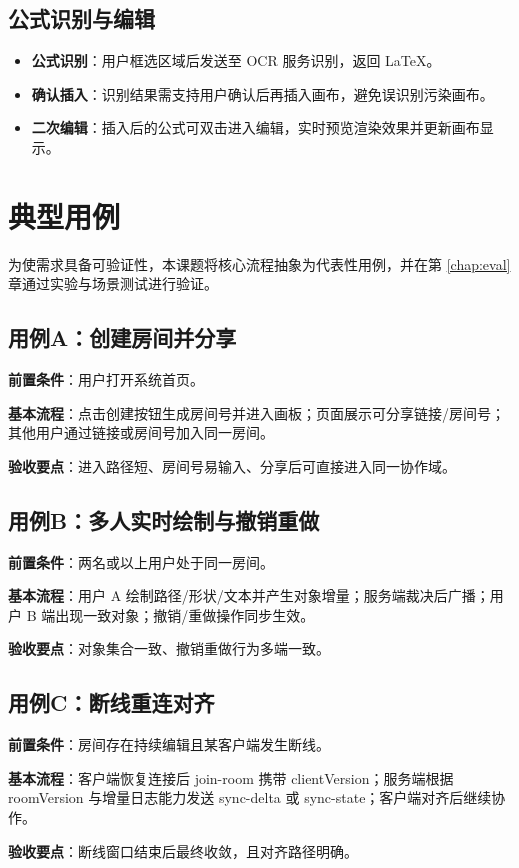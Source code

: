 \subsection{公式识别与编辑}
\begin{itemize}
  \item \textbf{公式识别}：用户框选区域后发送至 OCR 服务识别，返回 LaTeX。
  \item \textbf{确认插入}：识别结果需支持用户确认后再插入画布，避免误识别污染画布。
  \item \textbf{二次编辑}：插入后的公式可双击进入编辑，实时预览渲染效果并更新画布显示。
\end{itemize}

\section{典型用例}
为使需求具备可验证性，本课题将核心流程抽象为代表性用例，并在第 \ref{chap:eval} 章通过实验与场景测试进行验证。

\subsection{用例A：创建房间并分享}
\textbf{前置条件}：用户打开系统首页。\par
\textbf{基本流程}：点击创建按钮生成房间号并进入画板；页面展示可分享链接/房间号；其他用户通过链接或房间号加入同一房间。\par
\textbf{验收要点}：进入路径短、房间号易输入、分享后可直接进入同一协作域。

\subsection{用例B：多人实时绘制与撤销重做}
\textbf{前置条件}：两名或以上用户处于同一房间。\par
\textbf{基本流程}：用户 A 绘制路径/形状/文本并产生对象增量；服务端裁决后广播；用户 B 端出现一致对象；撤销/重做操作同步生效。\par
\textbf{验收要点}：对象集合一致、撤销重做行为多端一致。

\subsection{用例C：断线重连对齐}
\textbf{前置条件}：房间存在持续编辑且某客户端发生断线。\par
\textbf{基本流程}：客户端恢复连接后 join-room 携带 clientVersion；服务端根据 roomVersion 与增量日志能力发送 sync-delta 或 sync-state；客户端对齐后继续协作。\par
\textbf{验收要点}：断线窗口结束后最终收敛，且对齐路径明确。

